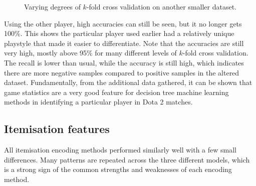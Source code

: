 \documentclass[Report.tex]{subfiles}
\begin{document}
\renewcommand{\rfplotbar}[2] {
\addplot+[mark=none] table [x=cv, y=#1, col sep=comma] {data/14-game-rf.csv};
\addlegendentry{#2}
}
\begin{figure}[H]
\caption{Varying degrees of $k$-fold cross validation on another smaller dataset.}
\end{figure}

Using the other player, high accuracies can still be seen, but it no longer gets 100\%. This shows the particular player used earlier had a relatively unique playstyle that made it easier to differentiate. Note that the accuracies are still very high, mostly above 95\% for many different levels of $k$-fold cross validation. The recall is lower than usual, while the accuracy is still high, which indicates there are more negative samples compared to positive samples in the altered dataset. Fundamentally, from the additional data gathered, it can be shown that game statistics are a very good feature for decision tree machine learning methods in identifying a particular player in Dota 2 matches. 



\subsection{Itemisation features}

All itemisation encoding methods performed similarly well with a few small differences. Many patterns are repeated across the three different models, which is a strong sign of the common strengths and weaknesses of each encoding method. 
\end{document}
